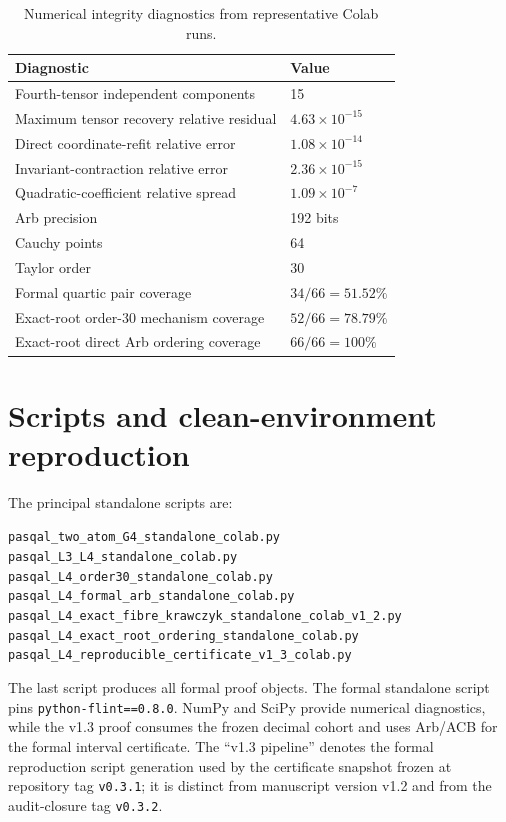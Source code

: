 \begin{table}[htbp]
\centering
\caption{Numerical integrity diagnostics from representative Colab runs.}
\label{tab:integrity}
\small
\begin{tabular}{@{}ll@{}}
\toprule
Diagnostic & Value\\
\midrule
Fourth-tensor independent components & 15\\
Maximum tensor recovery relative residual & $4.63\times10^{-15}$\\
Direct coordinate-refit relative error & $1.08\times10^{-14}$\\
Invariant-contraction relative error & $2.36\times10^{-15}$\\
Quadratic-coefficient relative spread & $1.09\times10^{-7}$\\
Arb precision & 192 bits\\
Cauchy points & 64\\
Taylor order & 30\\
Formal quartic pair coverage & $34/66=51.52\%$\\
Exact-root order-30 mechanism coverage & $52/66=78.79\%$\\
Exact-root direct Arb ordering coverage & $66/66=100\%$\\
\bottomrule
\end{tabular}
\end{table}

\section{Scripts and clean-environment reproduction}\label{app:scripts}

The principal standalone scripts are:
\begin{center}
\footnotesize\texttt{pasqal\_two\_atom\_G4\_standalone\_colab.py}\\
\footnotesize\texttt{pasqal\_L3\_L4\_standalone\_colab.py}\\
\footnotesize\texttt{pasqal\_L4\_order30\_standalone\_colab.py}\\
\footnotesize\texttt{pasqal\_L4\_formal\_arb\_standalone\_colab.py}\\
\footnotesize\texttt{pasqal\_L4\_exact\_fibre\_krawczyk\_standalone\_colab\_v1\_2.py}\\
\footnotesize\texttt{pasqal\_L4\_exact\_root\_ordering\_standalone\_colab.py}\\
\footnotesize\texttt{pasqal\_L4\_reproducible\_certificate\_v1\_3\_colab.py}
\end{center}
The last script produces all formal proof objects. The formal standalone script pins
\texttt{python-flint==0.8.0}. NumPy and SciPy provide numerical diagnostics, while the
v1.3 proof consumes the frozen decimal cohort and uses Arb/ACB for the formal interval
certificate. The ``v1.3 pipeline'' denotes the formal reproduction script generation used
by the certificate snapshot frozen at repository tag \texttt{v0.3.1}; it is distinct from
manuscript version v1.2 and from the audit-closure tag \texttt{v0.3.2}.

